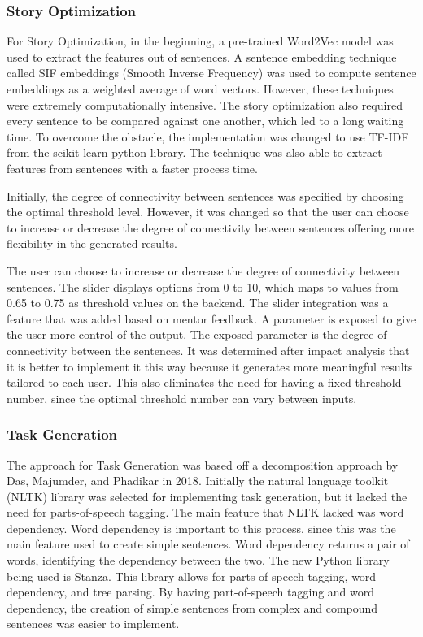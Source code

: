 \subsubsection{Story Optimization}
For Story Optimization, in the beginning, a pre-trained Word2Vec model was used to extract the features out of sentences. A sentence embedding technique called SIF embeddings (Smooth Inverse Frequency) was used to compute sentence embeddings as a weighted average of word vectors. However, these techniques were extremely computationally intensive. The story optimization also required every sentence to be compared against one another, which led to a long waiting time. To overcome the obstacle, the implementation was changed to use TF-IDF from the scikit-learn python library. The technique was also able to extract features from sentences with a faster process time.

Initially, the degree of connectivity between sentences was specified by choosing the optimal threshold level. However, it was changed so that the user can choose to increase or decrease the degree of connectivity between sentences offering more flexibility in the generated results.

The user can choose to increase or decrease the degree of connectivity between sentences. The slider displays options from 0 to 10, which maps to values from 0.65 to 0.75 as threshold values on the backend. The slider integration was a feature that was added based on mentor feedback. A parameter is exposed to give the user more control of the output. The exposed parameter is the degree of connectivity between the sentences. It was determined after impact analysis that it is better to implement it this way because it generates more meaningful results tailored to each user. This also eliminates the need for having a fixed threshold number, since the optimal threshold number can vary between inputs.

\subsubsection{Task Generation}
The approach for Task Generation was based off a decomposition approach by Das, Majumder, and Phadikar in 2018\cite{NLP1}. Initially the natural language toolkit (NLTK) library was selected for implementing task generation, but it lacked the need for parts-of-speech tagging. The main feature that NLTK lacked was word dependency. Word dependency is important to this process, since this was the main feature used to create simple sentences. Word dependency returns a pair of words, identifying the dependency between the two. The new Python library being used is Stanza. This library allows for parts-of-speech tagging, word dependency, and tree parsing. By having part-of-speech tagging and word dependency, the creation of simple sentences from complex and compound sentences was easier to implement.

